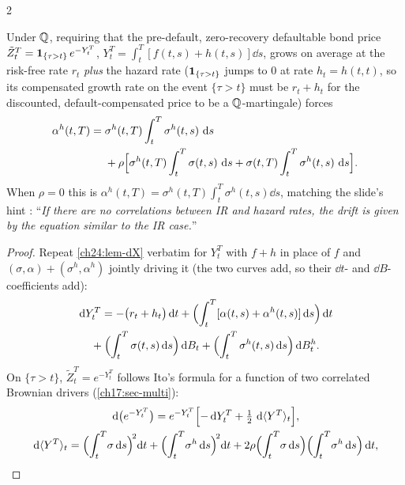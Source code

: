 \begin{paracol}{2}
\begin{theorem}\label{ch24:thm-hjmcredit}
Under $\mathbb{Q}$, requiring that the pre-default, zero-recovery defaultable bond price $\tilde Z_t^T=\mathbf{1}_{\{\tau>t\}}\,e^{-Y_t^T}$, $Y_t^T=\int_t^T[f(t,s)+h(t,s)]\dd s$, grows on average at the risk-free rate $r_t$ \emph{plus} the hazard rate ($\mathbf{1}_{\{\tau>t\}}$ jumps to $0$ at rate $h_t=h(t,t)$, so its compensated growth rate on the event $\{\tau>t\}$ must be $r_t+h_t$ for the discounted, default-compensated price to be a $\mathbb{Q}$-martingale) forces
\begin{equation}\label{ch24:eq-hjmcreditdrift}
  \begin{split}\alpha^h(t,T)={}&\sigma^h(t,T)\int_t^T\sigma^h(t,s)\,\,\mathrm{d} s\\&+\rho\Bigl[\sigma^h(t,T)\int_t^T\sigma(t,s)\,\,\mathrm{d} s+\sigma(t,T)\int_t^T\sigma^h(t,s)\,\,\mathrm{d} s\Bigr].\end{split}
\end{equation}
When $\rho=0$ this is $\alpha^h(t,T)=\sigma^h(t,T)\int_t^T\sigma^h(t,s)\dd s$, matching the slide's hint : ``\emph{If there are no correlations between IR and hazard rates, the drift is given by the equation similar to the IR case.}''
\end{theorem}
\begin{proof}
Repeat \cref{ch24:lem-dX} verbatim for $Y_t^T$ with $f+h$ in place of $f$ and $(\sigma,\alpha)+(\sigma^h,\alpha^h)$ jointly driving it (the two curves add, so their $\dd t$- and $\dd B$-coefficients add):
\[
\begin{gathered}
  \,\mathrm{d} Y_t^T=-\bigl(r_t+h_t\bigr)\,\mathrm{d} t+\Bigl(\int_t^T[\alpha(t,s)+\alpha^h(t,s)]\,\mathrm{d} s\Bigr)\,\mathrm{d} t\\
  {}+\Bigl(\int_t^T\sigma(t,s)\,\mathrm{d} s\Bigr)\,\mathrm{d} B_t+\Bigl(\int_t^T\sigma^h(t,s)\,\mathrm{d} s\Bigr)\,\mathrm{d} B^h_t .
\end{gathered}
\]
On $\{\tau>t\}$, $\tilde Z_t^T=e^{-Y_t^T}$ follows Ito's formula for a function of two correlated Brownian drivers (\cref{ch17:sec-multi}):
\[
\begin{gathered}
  \dd\bigl(e^{-Y_t^T}\bigr)=e^{-Y_t^T}\Bigl[-\dd Y_t^T+\tfrac12\,\dd\langle Y^T\rangle_t\Bigr],\\
  \dd\langle Y^T\rangle_t=\Bigl(\int_t^T\!\sigma\dd s\Bigr)^{\!2}\!\dd t+\Bigl(\int_t^T\!\sigma^h\dd s\Bigr)^{\!2}\!\dd t+2\rho\Bigl(\int_t^T\!\sigma\dd s\Bigr)\Bigl(\int_t^T\!\sigma^h\dd s\Bigr)\dd t ,
\end{gathered}
\]

\end{proof}
\end{paracol}
